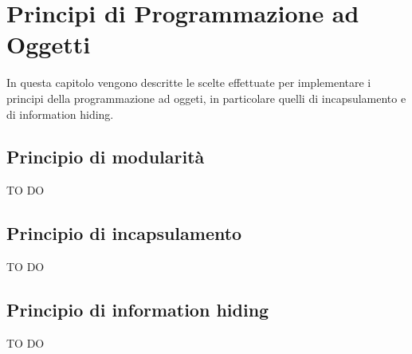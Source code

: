 % 
%
% 
%

\section{Principi di Programmazione ad Oggetti}
In questa capitolo vengono descritte le scelte effettuate per implementare i principi della programmazione ad oggeti, in particolare quelli di incapsulamento e di information hiding. \\

	\subsection{Principio di modularità}
TO DO

	\subsection{Principio di incapsulamento}
TO DO

	\subsection{Principio di information hiding}
TO DO

